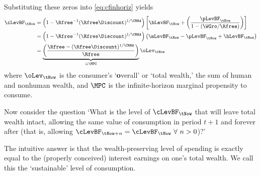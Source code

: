 Substituting these zeros into \eqref{eq:cfinhoriz} yields
\begin{equation}\begin{gathered}\begin{aligned}
        \cLevBF_{\tNow} & =  \left(1-\Rfree^{-1}(\Rfree\Discount)^{1/\CRRA}\right)\left[\bLevBF_{\tNow}+\left(\frac{\pLevBF_{\tNow}}{1-({\WGro}/\Rfree)}\right)\right] %
\\      & =  \left(1-\Rfree^{-1}(\Rfree\Discount)^{1/\CRRA}\right)\left(\mLevBF_{\tNow}-\pLevBF_{\tNow}+\hLevBF_{\tNow}\right)  %
\\      & =  \underbrace{\left(\frac{\Rfree -(\Rfree\Discount)^{1/\CRRA}}{\Rfree}\right)}_{ \equiv \MPC} \oLev_{\tNow} \label{eq:cOfw}
\end{aligned}\end{gathered}\end{equation}
where $\oLev_{\tNow}$ is the consumer's `{\bf o}verall' or `total wealth,' the sum of human and
nonhuman wealth, and $\MPC$ is the infinite-horizon marginal propensity to consume.

Now consider the question `What is the level of $\cLevBF_{\tNow}$ that will
leave total wealth intact, allowing the same value of consumption in
period $t+1$ and forever after (that is, allowing $\cLevBF_{\tNow+n}=\cLevBF_{\tNow}~\forall~n>0$)?'

The intuitive answer is that the wealth-preserving level of spending is exactly equal to the
(properly conceived) interest earnings on one's total
wealth.  We call this the `sustainable' level of consumption.

